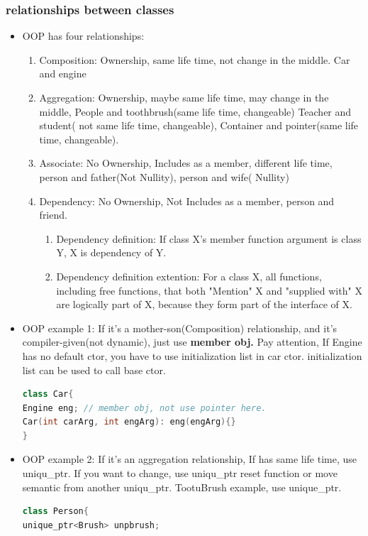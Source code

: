 \documentclass[a4paper,12pt,twoside]{book}
\begin{document}
\subsubsection{relationships between classes}
\begin{itemize}
\item OOP has four relationships:
\begin{enumerate}
\item Composition: Ownership, same life time,  not change in the middle. Car and engine
\item Aggregation: Ownership, maybe same life time, may change in the middle, People and toothbrush(same life time, changeable) Teacher and student( not same life time, changeable), Container and pointer(same life time, changeable).
\item Associate: No Ownership, Includes as a member,  different life time,  person and father(Not Nullity), person and wife( Nullity)
\item Dependency: No Ownership, Not Includes as a member, person and friend.
\begin{enumerate}
\item Dependency definition: If class X's member function argument is class Y, X is dependency of Y.
\item Dependency definition extention: For a class X, all functions, including free functions, that both "Mention" X and "supplied with" X are logically part of X, because they form part of the interface of X.
\end{enumerate}
\end{enumerate}

\item OOP example 1: If it's a mother-son(Composition) relationship, and it's compiler-given(not dynamic), just use \textbf{member obj.}   Pay attention, If Engine has no default ctor, you have to use initialization list in car ctor.  initialization list can be used to call base ctor.
\begin{lstlisting}[frame=single, language=c++]
class Car{
Engine eng; // member obj, not use pointer here.
Car(int carArg, int engArg): eng(engArg){}
}
\end{lstlisting}

\item OOP example 2:  If it's an aggregation relationship, If has same life time, use uniqu\_ptr. If you want to change, use uniqu\_ptr reset function or move semantic from another uniqu\_ptr.   TootuBrush example, use unique\_ptr.
\begin{lstlisting}[frame=single, language=c++]
class Person{
unique_ptr<Brush> unpbrush;


\end{lstlisting}
\end{itemize}
\end{document}
